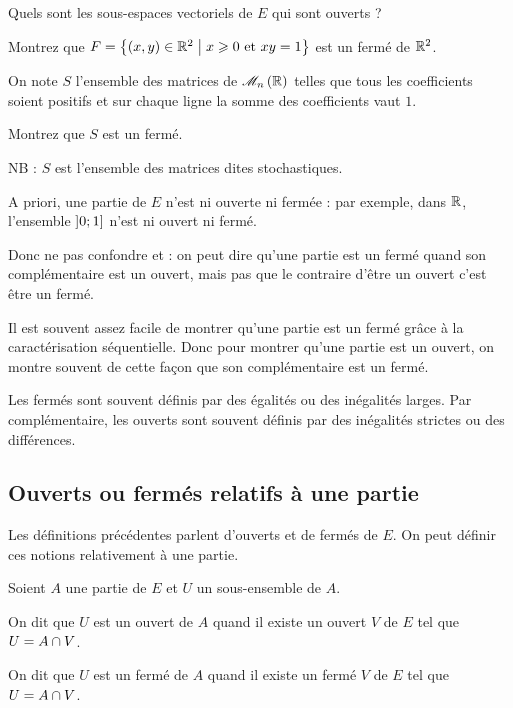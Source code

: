 \begin{exo}
Quels sont les sous-espaces vectoriels de \(E\) qui sont ouverts ?
\end{exo}

\begin{exo}
Montrez que \(F=\left\lbrace\left(x,y\right)\in\mathbb{R}^2\;\middle|\; x\geqslant0\text{ et }xy=1\right\rbrace\) est un fermé de \(\mathbb{R}^2\).
\end{exo}

\begin{exo}
On note \(S\) l'ensemble des matrices de \(\M{n}[\R]\) telles que tous les coefficients soient positifs et sur chaque ligne la somme des coefficients vaut \(1\).

Montrez que \(S\) est un fermé.

NB : \(S\) est l'ensemble des matrices dites stochastiques.
\end{exo}

\begin{rem}
A priori, une partie de \(E\) n'est ni ouverte ni fermée : par exemple, dans \(\mathbb{R}\), l'ensemble \(\left]0;1\right]\) n'est ni ouvert ni fermé.

Donc ne pas confondre  et  : on peut dire qu'une partie est un fermé quand son complémentaire est un ouvert, mais pas que le contraire d'être un ouvert c'est être un fermé.
\end{rem}

\begin{rem}
Il est souvent assez facile de montrer qu'une partie est un fermé grâce à la caractérisation séquentielle. Donc pour montrer qu'une partie est un ouvert, on montre souvent de cette façon que son complémentaire est un fermé.

Les fermés sont souvent définis par des égalités ou des inégalités larges. Par complémentaire, les ouverts sont souvent définis par des inégalités strictes ou des différences.
\end{rem}

\subsection{Ouverts ou fermés relatifs à une partie}

Les définitions précédentes parlent d'ouverts et de fermés de \(E\). On peut définir ces notions relativement à une partie.

\begin{defi}
Soient \(A\) une partie de \(E\) et \(U\) un sous-ensemble de \(A\).

On dit que \(U\) est un ouvert de \(A\) quand il existe un ouvert \(V\) de \(E\) tel que \(U=A\cap V\).

On dit que \(U\) est un fermé de \(A\) quand il existe un fermé \(V\) de \(E\) tel que \(U=A\cap V\).
\end{defi}

